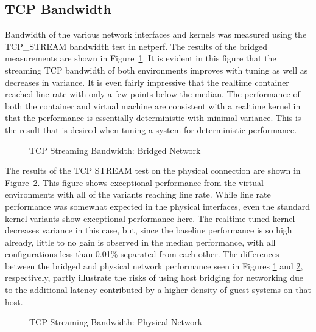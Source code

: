 \subsection{TCP Bandwidth} %
\label{sub:tcpbandwidth}
Bandwidth of the various network interfaces and kernels was measured using the TCP\_STREAM bandwidth test in netperf.
The results of the bridged measurements are shown in Figure~\ref{fig:tcp_stream_bridge}. 
It is evident in this figure that the streaming TCP bandwidth of both environments improves with tuning as well as decreases in variance.  
It is even fairly impressive that the realtime container reached line rate with only a few points below the median.  
The performance of both the container and virtual machine are consistent with a realtime kernel in that the performance is essentially deterministic with minimal variance.
This is the result that is desired when tuning a system for deterministic performance.

\begin{figure}
    \centering
    \def\svgwidth{\columnwidth}
    
    \caption{TCP Streaming Bandwidth: Bridged Network}
    \label{fig:tcp_stream_bridge}
\end{figure}

The results of the TCP STREAM test on the physical connection are shown in Figure~\ref{fig:tcp_stream_phys}.
This figure shows exceptional performance from the virtual environments with all of the variants reaching line rate.
While line rate performance was somewhat expected in the physical interfaces, even the standard kernel variants show exceptional performance here.
The realtime tuned kernel decreases variance in this case, but, since the baseline performance is so high already, little to no gain is observed in the median performance, with all configurations less than 0.01\% separated from each other.  
The differences between the bridged and physical network performance seen in Figures \ref{fig:tcp_stream_bridge} and \ref{fig:tcp_stream_phys}, respectively, partly illustrate the risks of using host bridging for networking due to the additional latency contributed by a higher density of guest systems on that host.  

\begin{figure}
    \centering
    \def\svgwidth{\columnwidth}
    
    \caption{TCP Streaming Bandwidth: Physical Network}
    \label{fig:tcp_stream_phys}
\end{figure}

